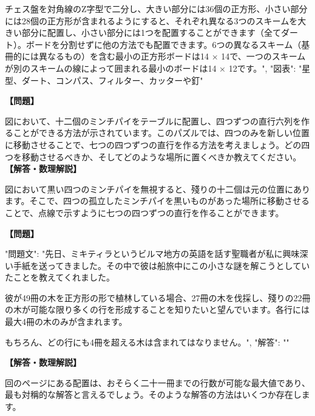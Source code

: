 \documentclass[10pt,a4paper,oneside,openany]{ltjsbook}
\begin{document}
\begin{tcolorbox}[colback=softblue,colframe=primaryblue,title=\textbf{第 210 問：THE TEN COINS.},arc=2mm,boxrule=1pt,breakable]
{チェス盤を対角線のZ字型で二分し、大きい部分には36個の正方形、小さい部分には28個の正方形が含まれるようにすると、それぞれ異なる3つのスキームを大きい部分に配置し、小さい部分には1つを配置することができます（全てダート）。ボードを分割せずに他の方法でも配置できます。6つの異なるスキーム（基冊的には異なるもの）を含む最小の正方形ボードは14 × 14で、一つのスキームが別のスキームの線によって囲まれる最小のボードは14 × 12です。",
"図表": "星型、ダート、コンパス、フィルター、カッターや釘"
}
\end{tcolorbox}

\begin{tcolorbox}[colback=softblue,colframe=primaryblue,title=\textbf{第 211 問：十二のミンチパイ （原題: THE TWELVE MINCE-PIES.）},arc=2mm,boxrule=1pt,breakable]
\textbf{【問題】}\par\vspace{0.3em}
図において、十二個のミンチパイをテーブルに配置し、四つずつの直行六列を作ることができる方法が示されています。このパズルでは、四つのみを新しい位置に移動させることで、七つの四つずつの直行を作る方法を考えましょう。どの四つを移動させるべきか、そしてどのような場所に置くべきか教えてください。
\tcblower
\textbf{【解答・数理解説】}\par\vspace{0.3em}
図において黒い四つのミンチパイを無視すると、殘りの十二個は元の位置にあります。そこで、四つの孤立したミンチパイを黒いものがあった場所に移動させることで、点線で示すように七つの四つずつの直行を作ることができます。
\end{tcolorbox}

\begin{tcolorbox}[colback=softblue,colframe=primaryblue,title=\textbf{第 212 問：THE BURMESE PLANTATION.},arc=2mm,boxrule=1pt,breakable]
\textbf{【問題】}\par\vspace{0.3em}
{
"問題文": "先日、ミキティラというビルマ地方の英語を話す聖職者が私に興味深い手紙を送ってきました。その中で彼は船旅中にこの小さな謎を解こうとしていたことを教えてくれました。

彼が49冊の木を正方形の形で植林している場合、27冊の木を伐採し、殘りの22冊の木が可能な限り多くの行を形成することを知りたいと望んでいます。各行には最大4冊の木のみが含まれます。

もちろん、どの行にも4冊を超える木は含まれてはなりません。",
"解答": ""
}
\tcblower
\textbf{【解答・数理解説】}\par\vspace{0.3em}
回のページにある配置は、おそらく二十一冊までの行数が可能な最大値であり、最も対稱的な解答と言えるでしょう。そのような解答の方法はいくつか存在します。
\end{tcolorbox}
\end{document}
